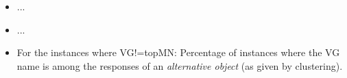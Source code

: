 




\begin{itemize}
	\item ...
	\item ...
	\item For the instances where VG!=topMN: Percentage of instances where the VG name is among the responses of an \textit{alternative object} (as given by clustering).
\end{itemize}


